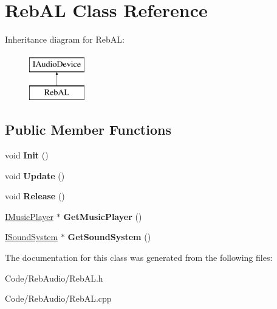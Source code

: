 \hypertarget{class_reb_a_l}{}\section{Reb\+AL Class Reference}
\label{class_reb_a_l}
Inheritance diagram for Reb\+AL\+:\begin{figure}[H]
\begin{center}
\leavevmode
\includegraphics[height=2.000000cm]{class_reb_a_l}
\end{center}
\end{figure}
\subsection*{Public Member Functions}
\begin{DoxyCompactItemize}
\item 
void {\bfseries Init} ()\hypertarget{class_reb_a_l_a936a32d17119bc94bc4810fc26631815}{}\label{class_reb_a_l_a936a32d17119bc94bc4810fc26631815}

\item 
void {\bfseries Update} ()\hypertarget{class_reb_a_l_aa5a00fffbd0ca09b0bf6140ddfff87ee}{}\label{class_reb_a_l_aa5a00fffbd0ca09b0bf6140ddfff87ee}

\item 
void {\bfseries Release} ()\hypertarget{class_reb_a_l_ae65ac1ade00c6e8cc811d111b92523d3}{}\label{class_reb_a_l_ae65ac1ade00c6e8cc811d111b92523d3}

\item 
\hyperlink{class_i_music_player}{I\+Music\+Player} $\ast$ {\bfseries Get\+Music\+Player} ()\hypertarget{class_reb_a_l_a5913f825f76c75d5af96402399789e1d}{}\label{class_reb_a_l_a5913f825f76c75d5af96402399789e1d}

\item 
\hyperlink{class_i_sound_system}{I\+Sound\+System} $\ast$ {\bfseries Get\+Sound\+System} ()\hypertarget{class_reb_a_l_a4ac899ae49e9719b4adfae8c6464d699}{}\label{class_reb_a_l_a4ac899ae49e9719b4adfae8c6464d699}

\end{DoxyCompactItemize}


The documentation for this class was generated from the following files\+:\begin{DoxyCompactItemize}
\item 
Code/\+Reb\+Audio/Reb\+A\+L.\+h\item 
Code/\+Reb\+Audio/Reb\+A\+L.\+cpp\end{DoxyCompactItemize}
